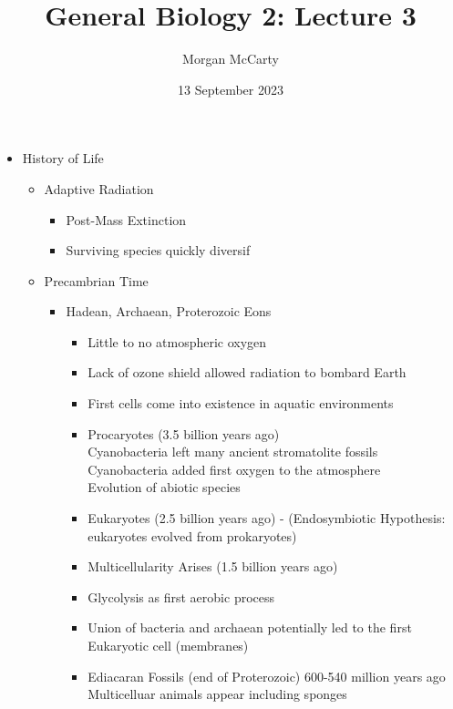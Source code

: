 \documentclass[12pt]{article}
\title{
    General Biology 2: Lecture 3}
\author{Morgan McCarty}
\date{13 September 2023}
\begin{document}
    \maketitle

    \begin{itemize}
        \item History of Life
        \begin{itemize}
            \item Adaptive Radiation
            \begin{itemize}
                \item Post-Mass Extinction
                \item Surviving species quickly diversif
            \end{itemize}
            \item Precambrian Time
            \begin{itemize}
                \item Hadean, Archaean, Proterozoic Eons
                \begin{itemize}
                    \item Little to no atmospheric oxygen
                    \item Lack of ozone shield allowed radiation to bombard Earth
                    \item First cells come into existence in aquatic environments
                    \item Procaryotes (3.5 billion years ago) \\
                    Cyanobacteria left many ancient stromatolite fossils \\
                    Cyanobacteria added first oxygen to the atmosphere \\
                    Evolution of abiotic species
                    \item Eukaryotes (2.5 billion years ago) - (Endosymbiotic Hypothesis: eukaryotes evolved from prokaryotes)
                    \item Multicellularity Arises (1.5 billion years ago)
                    \item Glycolysis as first aerobic process
                    \item Union of bacteria and archaean potentially led to the first Eukaryotic cell (membranes)
                    \item Ediacaran Fossils (end of Proterozoic) 600-540 million years ago \\
                    Multicelluar animals appear including sponges \\

\end{itemize}
\end{itemize}
\end{itemize}
\end{itemize}
\end{document}
